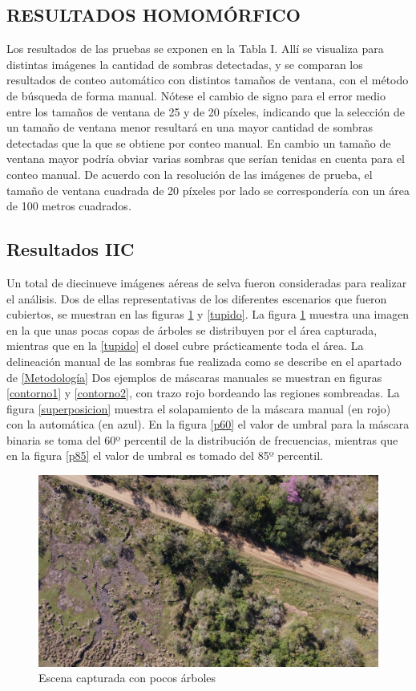 \subsection{RESULTADOS HOMOMÓRFICO}
Los resultados de las pruebas se exponen en la Tabla I. Allí se visualiza para distintas imágenes la cantidad de sombras detectadas, y se comparan los resultados de conteo automático con distintos tamaños de ventana, con el método de búsqueda de forma manual. Nótese el cambio de signo para el error medio entre los tamaños de ventana de 25 y de 20 píxeles, indicando que la selección de un tamaño de ventana menor resultará en una mayor 
cantidad de sombras detectadas que la que se obtiene por conteo manual. En cambio un tamaño de ventana mayor podría obviar varias sombras que serían tenidas en cuenta para el conteo manual. De acuerdo con la resolución de las imágenes de prueba, el tamaño de ventana cuadrada de 20 píxeles por lado se correspondería con un área de 100 metros cuadrados.



\color{cyan} %
\subsection{Resultados IIC} \label{Resultados}
Un total de diecinueve imágenes aéreas de selva fueron consideradas para realizar el análisis. Dos de ellas representativas de los diferentes escenarios que fueron cubiertos, se muestran en las figuras \ref{calle} y \ref{tupido}. La figura \ref{calle} muestra una imagen en la que unas pocas copas de árboles se distribuyen por el área capturada, mientras que en la \ref{tupido} el dosel cubre prácticamente toda el área. La delineación manual de las sombras fue realizada como se describe en el apartado de \ref{Metodología}
Dos ejemplos de máscaras manuales se muestran en figuras \ref{contorno1} y \ref{contorno2}, con trazo rojo bordeando las regiones sombreadas. La figura \ref{superposicion} muestra el solapamiento de la máscara manual (en rojo) con la automática (en azul). En la figura \ref{p60} el valor de umbral para la máscara binaria se toma del 60º percentil de la distribución de frecuencias, mientras que en la figura \ref{p85} el valor de umbral es tomado del 85º percentil.

\begin{figure}
    \includegraphics[width=\textwidth]{Imagenes/street.jpg}
     \hfill
     \caption{Escena capturada con pocos árboles}
    \label{calle}
\end{figure}


